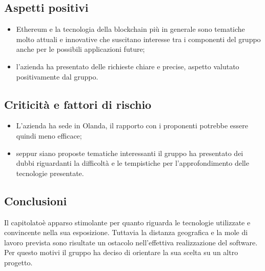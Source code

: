 \subsection{Aspetti positivi}
\begin{itemize}
    \item Ethereum e la tecnologia della blockchain più in generale sono tematiche molto attuali e innovative che suscitano interesse tra i componenti del gruppo
    anche per le possibili applicazioni future;
    \item l'azienda ha presentato delle richieste chiare e precise, aspetto valutato positivamente dal gruppo.
\end{itemize}
\subsection{Criticità e fattori di rischio}
\begin{itemize}
    \item L'azienda ha sede in Olanda, il rapporto con i proponenti potrebbe essere quindi meno efficace;
    \item seppur siano proposte tematiche interessanti il gruppo ha presentato dei dubbi riguardanti la difficoltà e le tempistiche per l'approfondimento
    delle tecnologie presentate.
\end{itemize}
\subsection{Conclusioni}
Il capitolato\glosp è apparso stimolante per quanto riguarda le tecnologie utilizzate e convincente nella sua esposizione. Tuttavia la distanza geografica e la
mole di lavoro prevista sono risultate un ostacolo nell'effettiva realizzazione del software. Per questo motivi il gruppo ha deciso di orientare la sua scelta
su un altro progetto\glo.
